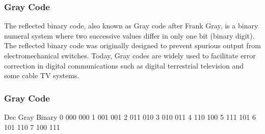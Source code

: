 \begin{frame}
\frametitle{Gray Code}
\Large

The reflected binary code, also known as Gray code after Frank Gray, is a binary numeral 
system where two successive values differ in only one bit (binary digit). The reflected binary code was originally designed to prevent spurious output from electromechanical switches. Today, Gray codes are widely used to facilitate error correction in digital communications such as digital terrestrial 
television and some cable TV systems.
\end{frame}

\begin{frame}
\frametitle{Gray Code}
\Large

Dec  Gray   Binary
 0   000    000
 1   001    001
 2   011    010
 3   010    011
 4   110    100
 5   111    101
 6   101    110
 7   100    111

\end{frame}
